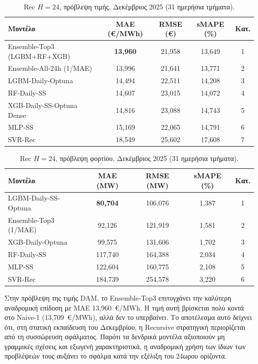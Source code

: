 \begin{table}[H]
  \centering
  \caption{Rec $H=24$, πρόβλεψη τιμής, Δεκέμβριος 2025 (31 ημερήσια τμήματα).}
  \label{tab:rec_price_dec}
  \small
  \begin{tabular}{lcccc}
    \toprule
    \textbf{Μοντέλο} & \textbf{MAE (€/MWh)} & \textbf{RMSE (€)} & \textbf{sMAPE (\%)} & \textbf{Κατ.} \\
    \midrule
    Ensemble-Top3 (LGBM+RF+XGB)      & \textbf{13,960} & 21,958 & 13,649 & 1 \\
    Ensemble-All-24h (1/MAE)          & 13,996 & 21,641 & 13,771 & 2 \\
    LGBM-Daily-Optuna                 & 14,494 & 22,511 & 14,208 & 3 \\
    RF-Daily-SS                       & 14,607 & 23,015 & 14,072 & 4 \\
    XGB-Daily-SS-Optuna Dense         & 14,816 & 23,088 & 14,743 & 5 \\
    MLP-SS                            & 15,169 & 22,065 & 14,791 & 6 \\
    SVR-Rec                           & 18,549 & 25,602 & 17,608 & 7 \\
    \bottomrule
  \end{tabular}
\end{table}

\begin{table}[H]
  \centering
  \caption{Rec $H=24$, πρόβλεψη φορτίου, Δεκέμβριος 2025 (31 ημερήσια τμήματα).}
  \label{tab:rec_load_dec}
  \begin{tabular}{lcccc}
    \toprule
    \textbf{Μοντέλο} & \textbf{MAE (MW)} & \textbf{RMSE (MW)} & \textbf{sMAPE (\%)} & \textbf{Κατ.} \\
    \midrule
    LGBM-Daily-SS-Optuna  & \textbf{80,704}  & 106,076 & 1,387 & 1 \\
    Ensemble-Top3 (1/MAE) & 92,126  & 121,919 & 1,581 & 2 \\
    XGB-Daily-Optuna      & 99,575  & 131,606 & 1,702 & 3 \\
    RF-Daily-SS           & 117,740 & 164,388 & 2,034 & 4 \\
    MLP-SS                & 122,604 & 160,775 & 2,108 & 5 \\
    SVR-Rec               & 184,739 & 254,578 & 3,220 & 6 \\
    \bottomrule
  \end{tabular}
\end{table}

Στην πρόβλεψη της τιμής DAM, το Ensemble-Top3 επιτυγχάνει την καλύτερη αναδρομική
επίδοση με MAE 13,960~€/MWh. Η τιμή αυτή βρίσκεται πολύ κοντά στο Naive-1
(13,709~€/MWh), αλλά δεν το υπερβαίνει. Το αποτέλεσμα αυτό δείχνει ότι, στη στατική
εκπαίδευση του Δεκεμβρίου, η Recursive στρατηγική περιορίζεται από τη συσσώρευση
σφάλματος. Παρότι τα δενδρικά μοντέλα αξιοποιούν μη γραμμικές σχέσεις και εξωγενή
χαρακτηριστικά, η αναδρομική χρήση των ίδιων των προβλέψεών τους αυξάνει το σφάλμα
κατά την εξέλιξη του 24ωρου ορίζοντα.


